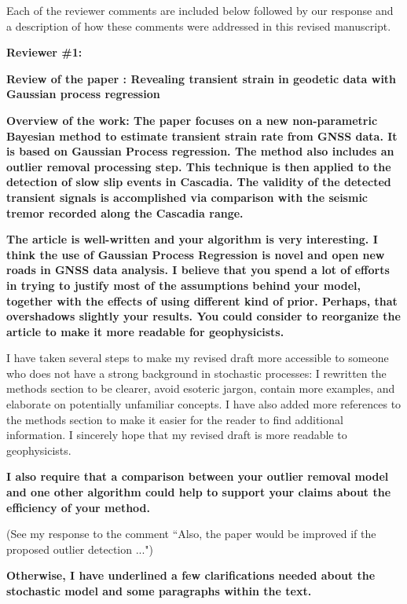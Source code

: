 \documentclass[10pt,a4paper]{letter}
\begin{document}
\begin{letter}{}
Each of the reviewer comments are included below followed by our
response and a description of how these comments were addressed in
this revised manuscript.


\textbf{Reviewer \#1:}\newline

\textbf{Review of the paper : Revealing transient strain in geodetic data
with Gaussian process regression}

\textbf{Overview of the work: The paper focuses on a new non-parametric
Bayesian method to estimate transient strain rate from GNSS data. It
is based on Gaussian Process regression. The method also includes an
outlier removal processing step. This technique is then applied to the
detection of slow slip events in Cascadia. The validity of the
detected transient signals is accomplished via comparison with the
seismic tremor recorded along the Cascadia range.}


\textbf{The article is well-written and your algorithm is very interesting. I
think the use of Gaussian Process Regression is novel and open new
roads in GNSS data analysis. I believe that you spend a lot of efforts
in trying to justify most of the assumptions behind your model,
together with the effects of using different kind of prior. Perhaps,
that overshadows slightly your results. You could consider to
reorganize the article to make it more readable for geophysicists.}

I have taken several steps to make my revised draft more accessible to
someone who does not have a strong background in stochastic processes:
I rewritten the methods section to be clearer, avoid esoteric jargon,
contain more examples, and elaborate on potentially unfamiliar
concepts. I have also added more references to the methods section to
make it easier for the reader to find additional information. I
sincerely hope that my revised draft is more readable to
geophysicists.

\textbf{I also require that a comparison between your outlier removal model
and one other algorithm could help to support your claims about the
efficiency of your method.}

(See my response to the comment ``Also, the paper would be improved if
the proposed outlier detection ...")

\textbf{Otherwise, I have underlined a few clarifications needed about the
stochastic model and some paragraphs within the text.}


\end{letter}
\end{document}
